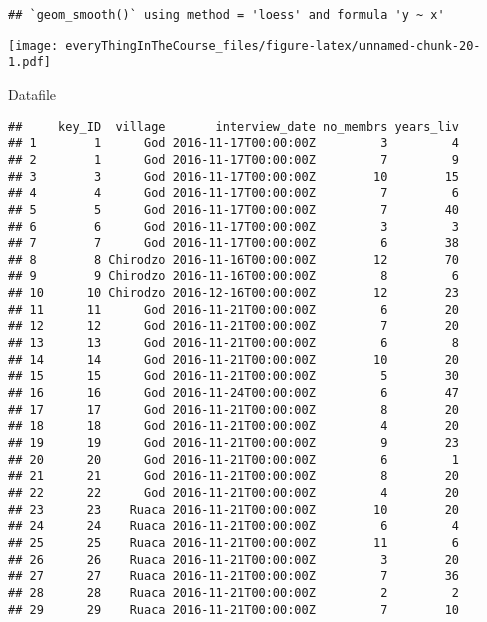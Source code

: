 \documentclass[
]{article}
\newenvironment{Shaded}{\begin{snugshade}}{\end{snugshade}}
\newcommand{\NormalTok}[1]{#1}
\begin{document}
\begin{verbatim}
## `geom_smooth()` using method = 'loess' and formula 'y ~ x'
\end{verbatim}

\texttt{[image: everyThingInTheCourse\_files/figure-latex/unnamed-chunk-20-1.pdf]}

\begin{Shaded}
\begin{Highlighting}[]
\NormalTok{Datafile}
\end{Highlighting}
\end{Shaded}

\begin{verbatim}
##     key_ID  village       interview_date no_membrs years_liv
## 1        1      God 2016-11-17T00:00:00Z         3         4
## 2        1      God 2016-11-17T00:00:00Z         7         9
## 3        3      God 2016-11-17T00:00:00Z        10        15
## 4        4      God 2016-11-17T00:00:00Z         7         6
## 5        5      God 2016-11-17T00:00:00Z         7        40
## 6        6      God 2016-11-17T00:00:00Z         3         3
## 7        7      God 2016-11-17T00:00:00Z         6        38
## 8        8 Chirodzo 2016-11-16T00:00:00Z        12        70
## 9        9 Chirodzo 2016-11-16T00:00:00Z         8         6
## 10      10 Chirodzo 2016-12-16T00:00:00Z        12        23
## 11      11      God 2016-11-21T00:00:00Z         6        20
## 12      12      God 2016-11-21T00:00:00Z         7        20
## 13      13      God 2016-11-21T00:00:00Z         6         8
## 14      14      God 2016-11-21T00:00:00Z        10        20
## 15      15      God 2016-11-21T00:00:00Z         5        30
## 16      16      God 2016-11-24T00:00:00Z         6        47
## 17      17      God 2016-11-21T00:00:00Z         8        20
## 18      18      God 2016-11-21T00:00:00Z         4        20
## 19      19      God 2016-11-21T00:00:00Z         9        23
## 20      20      God 2016-11-21T00:00:00Z         6         1
## 21      21      God 2016-11-21T00:00:00Z         8        20
## 22      22      God 2016-11-21T00:00:00Z         4        20
## 23      23    Ruaca 2016-11-21T00:00:00Z        10        20
## 24      24    Ruaca 2016-11-21T00:00:00Z         6         4
## 25      25    Ruaca 2016-11-21T00:00:00Z        11         6
## 26      26    Ruaca 2016-11-21T00:00:00Z         3        20
## 27      27    Ruaca 2016-11-21T00:00:00Z         7        36
## 28      28    Ruaca 2016-11-21T00:00:00Z         2         2
## 29      29    Ruaca 2016-11-21T00:00:00Z         7        10

\end{verbatim}
\end{document}
